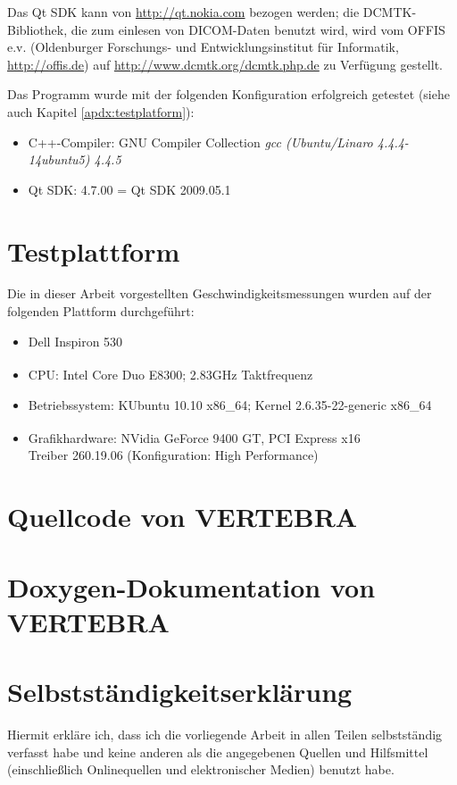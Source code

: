 \documentclass[a4paper,titlepage,12pt]{scrartcl}
\begin{document}
Das Qt SDK kann von \url{http://qt.nokia.com} bezogen werden; die DCMTK-Bibliothek, die zum einlesen von DICOM-Daten benutzt wird, wird vom OFFIS e.v. (Oldenburger Forschungs- und Entwicklungsinstitut für Informatik, \url{http://offis.de}) auf \url{http://www.dcmtk.org/dcmtk.php.de} zu Verfügung gestellt.

Das Programm wurde mit der folgenden Konfiguration erfolgreich getestet (siehe auch Kapitel \vref{apdx:testplatform}):
\begin{itemize}
 \item C++-Compiler: GNU Compiler Collection \textit{gcc (Ubuntu/Linaro 4.4.4-14ubuntu5) 4.4.5}
 \item Qt SDK: 4.7.00 = Qt SDK 2009.05.1
\end{itemize}

\section{Testplattform}\label{apdx:testplatform}
Die in dieser Arbeit vorgestellten Geschwindigkeitsmessungen wurden auf der folgenden Plattform durchgeführt:
\begin{itemize}
  \item Dell Inspiron 530
  \item CPU: Intel\textsuperscript{\textregistered} Core Duo E8300; 2.83GHz Taktfrequenz
  \item Betriebssystem: KUbuntu 10.10 x86\_64; Kernel 2.6.35-22-generic x86\_64
  \item Grafikhardware: NVidia\textsuperscript{\textregistered} GeForce 9400 GT, PCI Express x16\\
	Treiber 260.19.06 (Konfiguration: High Performance)
\end{itemize}
\section{Quellcode von VERTEBRA}
\section{Doxygen-Dokumentation von VERTEBRA}
\newpage
\renewcommand\refname{Literatur- und Quellenverzeichnis}


\section{Selbstständigkeitserklärung}
Hiermit erkläre ich, dass ich die vorliegende Arbeit in allen Teilen selbstständig verfasst habe und keine anderen als die angegebenen Quellen und Hilfsmittel (einschließlich Onlinequellen und elektronischer Medien) benutzt habe.
\end{document}
